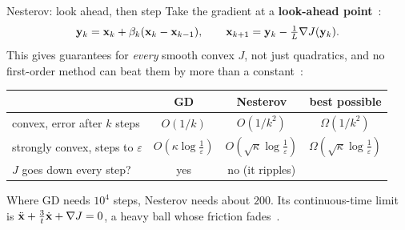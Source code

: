 \begin{frame}{Nesterov: look ahead, then step}
  \small
  Take the gradient at a \textbf{look-ahead point}~\cite{nesterov1983}:
  \[
    \mathbf{y}_k = \mathbf{x}_k + \beta_k(\mathbf{x}_k - \mathbf{x}_{k-1}),\qquad \mathbf{x}_{k+1} = \mathbf{y}_k - \tfrac1L\nabla J(\mathbf{y}_k).
  \]
  This gives guarantees for \emph{every} smooth convex $J$, not just quadratics, and no first-order method can beat
  them by more than a constant~\cite{nesterov2018}:
  \begin{center}\footnotesize
  \begin{tabular}{@{}l c c c@{}}
    \toprule
    & GD & Nesterov & best possible \\
    \midrule
    convex, error after $k$ steps & $O(1/k)$ & $O(1/k^2)$ & $\Omega(1/k^2)$ \\
    strongly convex, steps to $\varepsilon$ & $O(\kappa\log\frac1\varepsilon)$ & $O(\sqrt\kappa\log\frac1\varepsilon)$ & $\Omega(\sqrt\kappa\log\frac1\varepsilon)$ \\
    $J$ goes down every step? & yes & no (it ripples) & \\
    \bottomrule
  \end{tabular}
  \end{center}
  \footnotesize Where GD needs $10^4$ steps, Nesterov needs about $200$. Its continuous-time limit is
  $\ddot{\mathbf{x}} + \frac3t\dot{\mathbf{x}} + \nabla J = 0$, a heavy ball whose friction fades~\cite{su2016}.
\end{frame}


